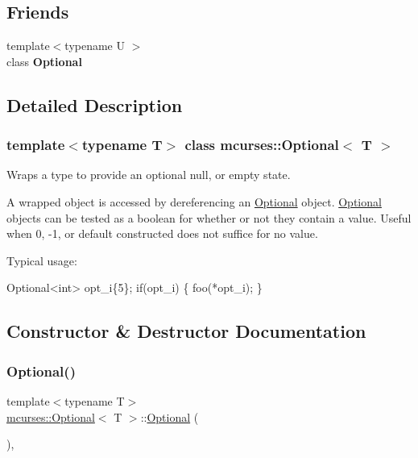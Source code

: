 \subsection*{Friends}
\begin{DoxyCompactItemize}
\item 
\hypertarget{classmcurses_1_1Optional_a1765268b663a7e1bce2246dec366ac57}{}\label{classmcurses_1_1Optional_a1765268b663a7e1bce2246dec366ac57} 
{\footnotesize template$<$typename U $>$ }\\class {\bfseries Optional}
\end{DoxyCompactItemize}


\subsection{Detailed Description}
\subsubsection*{template$<$typename T$>$\newline
class mcurses\+::\+Optional$<$ T $>$}

Wraps a type to provide an optional \textquotesingle{}null\textquotesingle{}, or empty state. 

A wrapped object is accessed by dereferencing an \hyperlink{classmcurses_1_1Optional}{Optional} object. \hyperlink{classmcurses_1_1Optional}{Optional} objects can be tested as a boolean for whether or not they contain a value. Useful when 0, -\/1, or default constructed does not suffice for \textquotesingle{}no value\textquotesingle{}.

Typical usage\+: 
\begin{DoxyCode}
Optional<int> opt\_i\{5\};
\textcolor{keywordflow}{if}(opt\_i) \{
    foo(*opt\_i);
\}
\end{DoxyCode}
 

\subsection{Constructor \& Destructor Documentation}
\hypertarget{classmcurses_1_1Optional_a623c4f75b05b17ec7ad6d80faa302a5b}{}\label{classmcurses_1_1Optional_a623c4f75b05b17ec7ad6d80faa302a5b} 
\subsubsection{\texorpdfstring{Optional()}{Optional()}\hspace{0.1cm}{\footnotesize\ttfamily [1/10]}}
{\footnotesize\ttfamily template$<$typename T$>$ \\
\hyperlink{classmcurses_1_1Optional}{mcurses\+::\+Optional}$<$ T $>$\+::\hyperlink{classmcurses_1_1Optional}{Optional} (\begin{DoxyParamCaption}{ }\end{DoxyParamCaption})\hspace{0.3cm}{\ttfamily [inline]}, {\ttfamily [noexcept]}}



